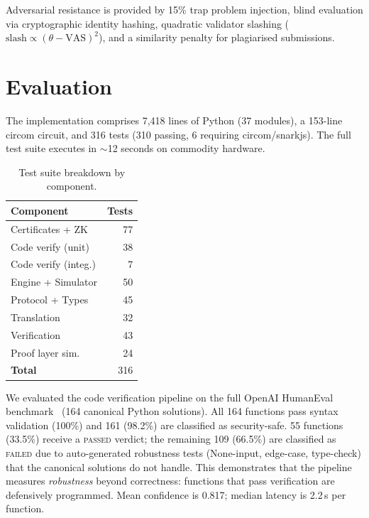 \documentclass[10pt,a4paper,twocolumn]{article}
\begin{document}
Adversarial resistance is provided by 15\% trap problem injection,
blind evaluation via cryptographic identity hashing, quadratic validator
slashing ($\text{slash} \propto (\theta - \text{VAS})^2$), and a
similarity penalty for plagiarised submissions.

\section{Evaluation}

The implementation comprises 7{,}418 lines of Python (37 modules), a
153-line circom circuit, and 316 tests (310 passing, 6 requiring
circom/snarkjs).  The full test suite executes in $\sim$12 seconds on
commodity hardware.

\begin{table}[h]
\centering
\small
\begin{tabular}{@{}lr@{}}
\toprule
\textbf{Component} & \textbf{Tests} \\
\midrule
Certificates + ZK   & 77 \\
Code verify (unit)   & 38 \\
Code verify (integ.) & 7 \\
Engine + Simulator   & 50 \\
Protocol + Types     & 45 \\
Translation          & 32 \\
Verification         & 43 \\
Proof layer sim.     & 24 \\
\midrule
\textbf{Total}       & 316 \\
\bottomrule
\end{tabular}
\caption{Test suite breakdown by component.}
\end{table}

We evaluated the code verification pipeline on the full OpenAI
HumanEval benchmark~\citep{humaneval2021} (164 canonical Python
solutions).  All 164 functions pass syntax validation (100\%) and 161
(98.2\%) are classified as security-safe.  55 functions (33.5\%)
receive a \textsc{passed} verdict; the remaining 109 (66.5\%) are
classified as \textsc{failed} due to auto-generated robustness tests
(None-input, edge-case, type-check) that the canonical solutions do
not handle.  This demonstrates that the pipeline measures
\emph{robustness} beyond correctness: functions that pass verification
are defensively programmed.  Mean confidence is 0.817; median latency
is 2.2\,s per function.
\end{document}
